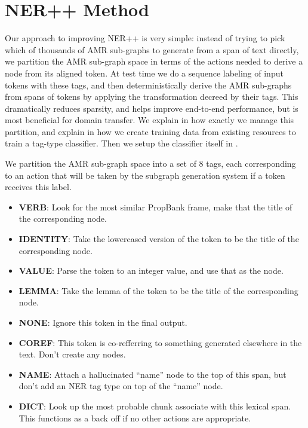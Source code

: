 \documentclass[11pt]{article}
\begin{document}
\section{NER++ Method}

Our approach to improving NER++ is very simple: instead of trying to pick which of thousands of AMR sub-graphs to generate from a span of text directly, we partition the AMR sub-graph space in terms of the actions needed to derive a node from its aligned token. At test time we do a sequence labeling of input tokens with these tags, and then deterministically derive the AMR sub-graphs from spans of tokens by applying the transformation decreed by their tags. This dramatically reduces sparsity, and helps improve end-to-end performance, but is most beneficial for domain transfer. We explain in  how exactly we manage this partition, and explain in  how we create training data from existing resources to train a tag-type classifier. Then we setup the classifier itself in .


We partition the AMR sub-graph space into a set of 8 tags, each corresponding to an action that will be taken by the subgraph generation system if a token receives this label.

\begin{itemize}
\item \textbf{VERB}: Look for the most similar PropBank frame, make that the title of the corresponding node.
\item \textbf{IDENTITY}: Take the lowercased version of the token to be the title of the corresponding node.
\item \textbf{VALUE}: Parse the token to an integer value, and use that as the node.
\item \textbf{LEMMA}: Take the lemma of the token to be the title of the corresponding node.
\item \textbf{NONE}: Ignore this token in the final output.
\item \textbf{COREF}: This token is co-refferring to something generated elsewhere in the text. Don't create any nodes.
\item \textbf{NAME}: Attach a hallucinated ``name'' node to the top of this span, but don't add an NER tag type on top of the ``name'' node.
\item \textbf{DICT}: Look up the most probable chunk associate with this lexical span. This functions as a back off if no other actions are appropriate.
\end{itemize}
\end{document}
